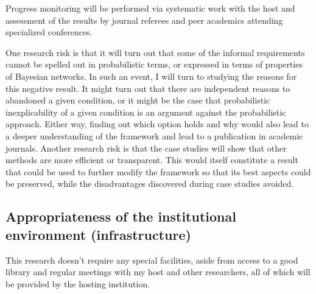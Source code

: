 \documentclass[11pt, a4paper]{article}
\begin{document}
\vspace{-2mm}

Progress monitoring will be performed via systematic work with the host and assessment of the results by journal referees and peer academics attending specialized conferences.

One research risk is that it will turn out that some of the informal requirements cannot be spelled out in probabilistic terms, or expressed in terms of properties of Bayesian networks. In such an event, I will turn to studying the reasons for this negative result. It might turn out that there are independent reasons to abandoned a given condition, or it might be the case that probabilistic inexplicability of a given condition is an argument against the probabilistic approach. Either way, finding out which option holds and why would also lead to a deeper understanding of the framework and lead to a publication in academic journals. Another research risk is that the case studies will show that other methods are more efficient or transparent. This would itself constitute a result that could be used to further modify the framework so that its best aspects could be preserved, while the disadvantages discovered during case studies avoided. 




\vspace{-3mm}

\subsection{Appropriateness of the institutional environment (infrastructure)}

\vspace{-2mm}

This research doesn't require any special facilities, aside from access to a good library and regular meetings with my host and other researchers, all of which will be provided by the hosting institution. 
\end{document}
